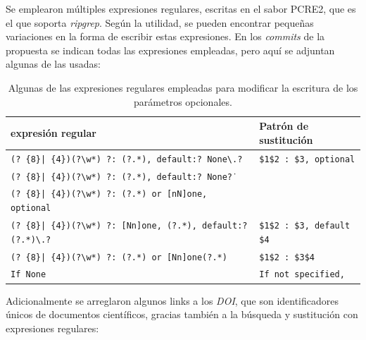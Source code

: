 Se emplearon múltiples expresiones regulares, escritas en el sabor PCRE2, que es el que soporta \textit{ripgrep}. Según la utilidad, se pueden encontrar pequeñas variaciones en la forma de escribir estas expresiones. En los \textit{commits} de la propuesta se indican todas las expresiones empleadas, pero aquí se adjuntan algunas de las usadas:

\begin{table}[H]
    \centering
    \begin{adjustbox}{max width=\textwidth}
        \begin{tabular}{l|l}
            \Gls{expresión regular}                                                                                       & Patrón de sustitución              \\
            \hline
            \texttt{(? \{8\}| \{4\})(?\textbackslash{}w*) ?: (?.*), default:? None\textbackslash{}.?}               & \texttt{\$1\$2 : \$3, optional}    \\
            \texttt{(? \{8\}| \{4\})(?\textbackslash{}w*) ?: (?.*), default:? None\.?}                              &                                    \\
            \texttt{(? \{8\}| \{4\})(?\textbackslash{}w*) ?: (?.*) or {[}nN{]}one, optional}                        &                                    \\
            \hline
            \texttt{(? \{8\}| \{4\})(?\textbackslash{}w*) ?: {[}Nn{]}one, (?.*), default:? (?.*)\textbackslash{}.?} & \texttt{\$1\$2 : \$3, default \$4} \\
            \hline
            \texttt{(? \{8\}| \{4\})(?\textbackslash{}w*) ?: (?.*) or {[}Nn{]}one(?.*)}                             & \texttt{\$1\$2 : \$3\$4}           \\
            \hline
            \texttt{If None}                                                                                        & \texttt{If not specified,}         \\
        \end{tabular}
    \end{adjustbox}
    \caption{Algunas de las expresiones regulares empleadas para modificar la escritura de los parámetros opcionales.}
    \label{tab:expresiones_regulares_default_none}
\end{table}

Adicionalmente se arreglaron algunos links a los \textit{DOI}, que son identificadores únicos de documentos científicos, gracias también a la búsqueda y sustitución con expresiones regulares:

